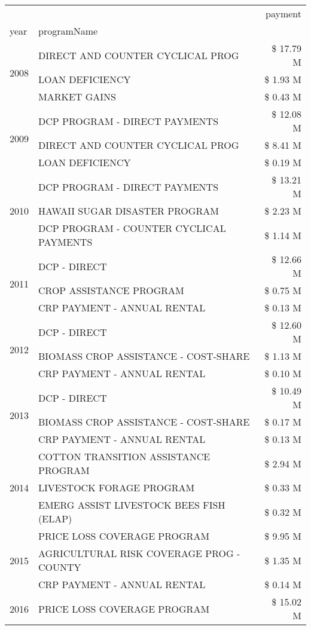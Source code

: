 \begin{tabular}{llr}
\toprule
 &  & payment \\
year & programName &  \\
\midrule
\multirow[t]{3}{*}{2008} & DIRECT AND COUNTER CYCLICAL PROG & \$ 17.79 M \\
 & LOAN DEFICIENCY & \$ 1.93 M \\
 & MARKET GAINS & \$ 0.43 M \\
\cline{1-3}
\multirow[t]{3}{*}{2009} & DCP PROGRAM - DIRECT PAYMENTS & \$ 12.08 M \\
 & DIRECT AND COUNTER CYCLICAL PROG & \$ 8.41 M \\
 & LOAN DEFICIENCY & \$ 0.19 M \\
\cline{1-3}
\multirow[t]{3}{*}{2010} & DCP PROGRAM - DIRECT PAYMENTS & \$ 13.21 M \\
 & HAWAII SUGAR DISASTER PROGRAM & \$ 2.23 M \\
 & DCP PROGRAM - COUNTER CYCLICAL PAYMENTS & \$ 1.14 M \\
\cline{1-3}
\multirow[t]{3}{*}{2011} & DCP - DIRECT & \$ 12.66 M \\
 & CROP ASSISTANCE PROGRAM & \$ 0.75 M \\
 & CRP PAYMENT - ANNUAL RENTAL & \$ 0.13 M \\
\cline{1-3}
\multirow[t]{3}{*}{2012} & DCP - DIRECT & \$ 12.60 M \\
 & BIOMASS CROP ASSISTANCE - COST-SHARE & \$ 1.13 M \\
 & CRP PAYMENT - ANNUAL RENTAL & \$ 0.10 M \\
\cline{1-3}
\multirow[t]{3}{*}{2013} & DCP - DIRECT & \$ 10.49 M \\
 & BIOMASS CROP ASSISTANCE - COST-SHARE & \$ 0.17 M \\
 & CRP PAYMENT - ANNUAL RENTAL & \$ 0.13 M \\
\cline{1-3}
\multirow[t]{3}{*}{2014} & COTTON TRANSITION ASSISTANCE PROGRAM & \$ 2.94 M \\
 & LIVESTOCK FORAGE PROGRAM & \$ 0.33 M \\
 & EMERG ASSIST LIVESTOCK BEES FISH (ELAP) & \$ 0.32 M \\
\cline{1-3}
\multirow[t]{3}{*}{2015} & PRICE LOSS COVERAGE PROGRAM & \$ 9.95 M \\
 & AGRICULTURAL RISK COVERAGE PROG - COUNTY & \$ 1.35 M \\
 & CRP PAYMENT - ANNUAL RENTAL & \$ 0.14 M \\
\cline{1-3}
\multirow[t]{3}{*}{2016} & PRICE LOSS COVERAGE PROGRAM                   & \$ 15.02 M \\

\end{tabular}
